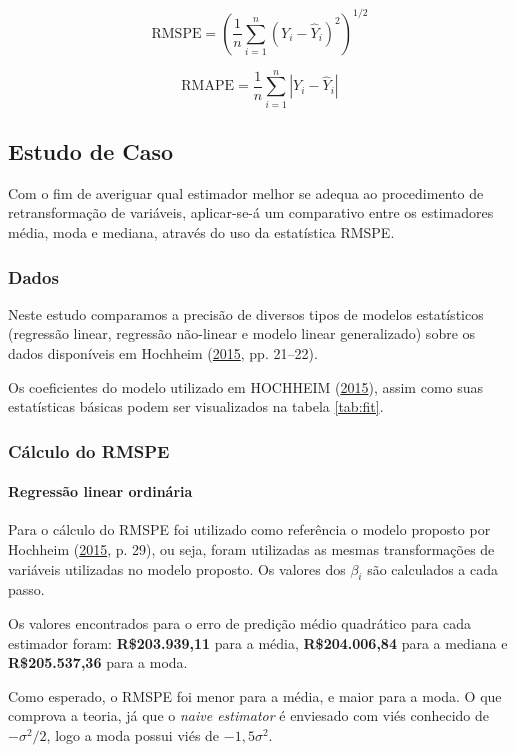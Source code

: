 \documentclass[a4paper, 12pt]{article}
\let\oldparagraph\paragraph
\renewcommand{\paragraph}[1]{\oldparagraph{#1}\mbox{}}
\begin{document}
\[\text{RMSPE} = \left ( \frac{1}{n}\sum_{i = 1}^{n}(Y_i - \hat{Y}_i)^2 \right ) ^{1/2}\]

\[\text{RMAPE} = \frac{1}{n}\sum_{i = 1}^{n}|Y_i - \hat{Y}_i|\]

\subsection{Estudo de Caso}\label{estudo-de-caso}

Com o fim de averiguar qual estimador melhor se adequa ao procedimento
de retransformação de variáveis, aplicar-se-á um comparativo entre os
estimadores média, moda e mediana, através do uso da estatística RMSPE.

\subsubsection{Dados}\label{dados}

Neste estudo comparamos a precisão de diversos tipos de modelos
estatísticos (regressão linear, regressão não-linear e modelo linear
generalizado) sobre os dados disponíveis em Hochheim
(\protect\hyperlink{ref-hochheim}{2015}, pp. 21--22).

Os coeficientes do modelo utilizado em HOCHHEIM
(\protect\hyperlink{ref-hochheim}{2015}), assim como suas estatísticas
básicas podem ser visualizados na tabela \ref{tab:fit}.

\subsubsection{Cálculo do RMSPE}\label{calculo-do-rmspe}

\paragraph{Regressão linear ordinária}\label{regressao-linear-ordinaria}

Para o cálculo do RMSPE foi utilizado como referência o modelo proposto
por Hochheim (\protect\hyperlink{ref-hochheim}{2015}, p. 29), ou seja,
foram utilizadas as mesmas transformações de variáveis utilizadas no
modelo proposto. Os valores dos \(\beta_i\) são calculados a cada passo.

Os valores encontrados para o erro de predição médio quadrático para
cada estimador foram: \textbf{R\$203.939,11} para a média,
\textbf{R\$204.006,84} para a mediana e \textbf{R\$205.537,36} para a
moda.

Como esperado, o RMSPE foi menor para a média, e maior para a moda. O
que comprova a teoria, já que o \emph{naive estimator} é enviesado com
viés conhecido de \(-\sigma^2/2\), logo a moda possui viés de
\(-1,5\sigma^2\).
\end{document}
